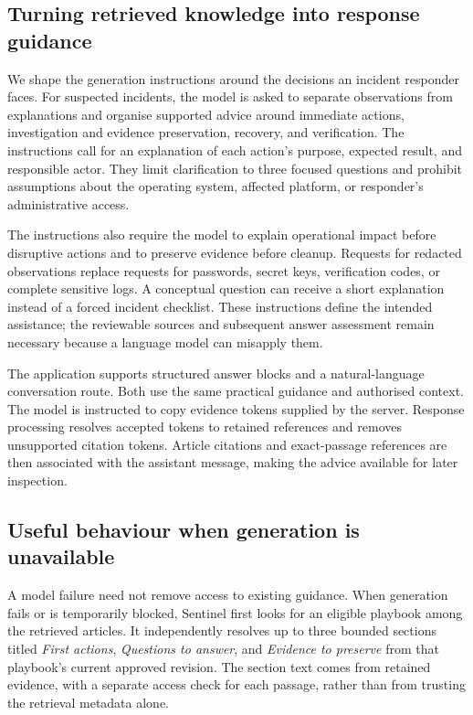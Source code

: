\subsection{Turning retrieved knowledge into response guidance}

We shape the generation instructions around the decisions an incident responder faces. For suspected incidents, the model is asked to separate observations from explanations and organise supported advice around immediate actions, investigation and evidence preservation, recovery, and verification. The instructions call for an explanation of each action's purpose, expected result, and responsible actor. They limit clarification to three focused questions and prohibit assumptions about the operating system, affected platform, or responder's administrative access.

The instructions also require the model to explain operational impact before disruptive actions and to preserve evidence before cleanup. Requests for redacted observations replace requests for passwords, secret keys, verification codes, or complete sensitive logs. A conceptual question can receive a short explanation instead of a forced incident checklist. These instructions define the intended assistance; the reviewable sources and subsequent answer assessment remain necessary because a language model can misapply them.

The application supports structured answer blocks and a natural-language conversation route. Both use the same practical guidance and authorised context. The model is instructed to copy evidence tokens supplied by the server. Response processing resolves accepted tokens to retained references and removes unsupported citation tokens. Article citations and exact-passage references are then associated with the assistant message, making the advice available for later inspection.

\subsection{Useful behaviour when generation is unavailable}

A model failure need not remove access to existing guidance. When generation fails or is temporarily blocked, Sentinel first looks for an eligible playbook among the retrieved articles. It independently resolves up to three bounded sections titled \emph{First actions}, \emph{Questions to answer}, and \emph{Evidence to preserve} from that playbook's current approved revision. The section text comes from retained evidence, with a separate access check for each passage, rather than from trusting the retrieval metadata alone.


